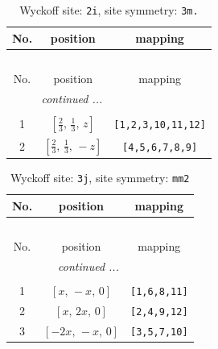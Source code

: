 \documentclass[fleqn,8pt]{jsarticle}
\begin{document}
\renewcommand{\arraystretch}{1.2}
\begin{longtable}{ccc}
\caption{Wyckoff site: {\tt 2i}, site symmetry: {\tt 3m.}}
 \\
 \hline \hline
No. & position & mapping \\ \hline \endfirsthead

\multicolumn{2}{l}{\tablename\ \thetable{}} \\
 \hline \hline
No. & position & mapping \\ \hline \endhead

 \hline \hline
\multicolumn{2}{r}{\footnotesize\it continued ...} \\ \endfoot

 \hline \hline
\multicolumn{2}{r}{} \\ \endlastfoot

1 & $\left[ \frac{2}{3},\, \frac{1}{3},\, z \right]$ & {\tt [1,2,3,10,11,12]} \\ \hline
2 & $\left[ \frac{2}{3},\, \frac{1}{3},\, - z \right]$ & {\tt [4,5,6,7,8,9]} \\
\end{longtable}
\renewcommand{\arraystretch}{1.2}
\begin{longtable}{ccc}
\caption{Wyckoff site: {\tt 3j}, site symmetry: {\tt mm2}}
 \\
 \hline \hline
No. & position & mapping \\ \hline \endfirsthead

\multicolumn{2}{l}{\tablename\ \thetable{}} \\
 \hline \hline
No. & position & mapping \\ \hline \endhead

 \hline \hline
\multicolumn{2}{r}{\footnotesize\it continued ...} \\ \endfoot

 \hline \hline
\multicolumn{2}{r}{} \\ \endlastfoot

1 & $\left[ x,\, - x,\, 0 \right]$ & {\tt [1,6,8,11]} \\ \hline
2 & $\left[ x,\, 2 x,\, 0 \right]$ & {\tt [2,4,9,12]} \\ \hline
3 & $\left[ - 2 x,\, - x,\, 0 \right]$ & {\tt [3,5,7,10]} \\
\end{longtable}
\renewcommand{\arraystretch}{1.2}
\end{document}
